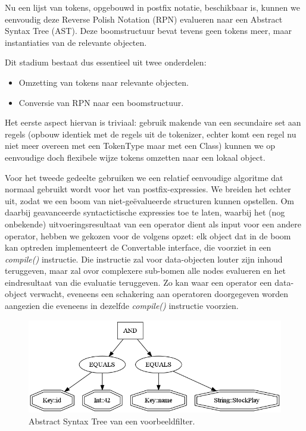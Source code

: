Nu een lijst van tokens, opgebouwd in postfix notatie, beschikbaar is, kunnen we eenvoudig deze Reverse Polish Notation (RPN) evalueren naar een Abstract Syntax Tree (AST). Deze boomstructuur bevat tevens geen tokens meer, maar instantiaties van de relevante objecten.

Dit stadium bestaat dus essentieel uit twee onderdelen:
\begin{itemize}
\item Omzetting van tokens naar relevante objecten.
\item Conversie van RPN naar een boomstructuur.
\end{itemize}

Het eerste aspect hiervan is triviaal: gebruik makende van een secundaire set aan regels (opbouw identiek met de regels uit de tokenizer, echter komt een regel nu niet meer overeen met een TokenType maar met een Class) kunnen we op eenvoudige doch flexibele wijze tokens omzetten naar een lokaal object.

Voor het tweede gedeelte gebruiken we een relatief eenvoudige algoritme dat normaal gebruikt wordt voor het  van postfix-expressies. We breiden het echter uit, zodat we een boom van niet-ge\"evalueerde structuren kunnen opstellen. Om daarbij geavanceerde syntactictische expressies toe te laten, waarbij het (nog onbekende) uitvoeringsresultaat van een operator dient als input voor een andere operator, hebben we gekozen voor de volgens opzet: elk object dat in de boom kan optreden implementeert de Convertable interface, die voorziet in een \emph{compile()} instructie. Die instructie zal voor data-objecten louter zijn inhoud teruggeven, maar zal ovor complexere sub-bomen alle nodes evalueren en het eindresultaat van die evaluatie teruggeven. Zo kan waar een operator een data-object verwacht, eveneens een schakering aan operatoren doorgegeven worden aangezien die eveneens in dezelfde \emph{compile()} instructie voorzien.

\begin{figure}[h!]
	\centering
		\includegraphics[width=\textwidth]{images/realisatie/AST}
	\caption{Abstract Syntax Tree van een voorbeeldfilter.}
\end{figure}

